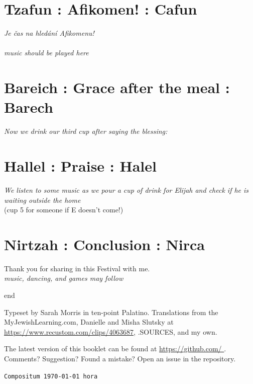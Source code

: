 \documentclass[a5paper,10pt]{memoir}
\begin{document}
\section{Tzafun : Afikomen! : Cafun}
\textit{\color{black} Je čas na hledání Afikomenu!\\
\\
music should be played here}

\section{Bareich : Grace after the meal : Barech}
\Bareich
\textit{\color{midblue} Now we drink our third cup after saying the blessing:}\\
\color{black}
\Kaddeish

\section{Hallel : Praise : Halel}
\textit{\color{midblue} We listen to some music as we pour a cup of drink for Elijah and check if he is waiting outside the home}\\
\color{black}
\Hallel
\Elijah (cup 5 for someone if E doesn't come!)\\
% 

\section{Nirtzah : Conclusion : Nirca}
\Nirtzah
% 
Thank you for sharing in this Festival with me.\\
\textit{music, dancing, and games may follow}
\begin{center}
	{end}
\end{center}

\ChadGayahText

\vfill
%
Typeset by Sarah Morris in ten-point Palatino.  Translations from the
MyJewishLearning.com, Danielle and Misha Slutsky at \url{https://www.recustom.com/clips/4063687}, .SOURCES, and my own.

% 
The latest version of this booklet can be found at
\url{ https://github.com/ }. Comments?
Suggestion? Found a mistake? Open an issue in the repository.
% 

{\centering\footnotesize\texttt{Compositum \today\ hora \currenttime}\par}
\end{document}
